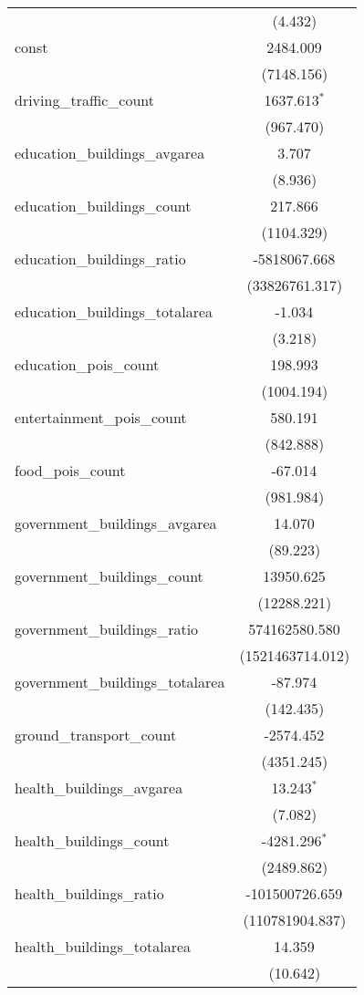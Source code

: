 \begin{table}[!htbp]
\begin{tabular}{@{\extracolsep{5pt}}lc}
  & (4.432) \\
 const & 2484.009$^{}$ \\
  & (7148.156) \\
 driving_traffic_count & 1637.613$^{*}$ \\
  & (967.470) \\
 education_buildings_avgarea & 3.707$^{}$ \\
  & (8.936) \\
 education_buildings_count & 217.866$^{}$ \\
  & (1104.329) \\
 education_buildings_ratio & -5818067.668$^{}$ \\
  & (33826761.317) \\
 education_buildings_totalarea & -1.034$^{}$ \\
  & (3.218) \\
 education_pois_count & 198.993$^{}$ \\
  & (1004.194) \\
 entertainment_pois_count & 580.191$^{}$ \\
  & (842.888) \\
 food_pois_count & -67.014$^{}$ \\
  & (981.984) \\
 government_buildings_avgarea & 14.070$^{}$ \\
  & (89.223) \\
 government_buildings_count & 13950.625$^{}$ \\
  & (12288.221) \\
 government_buildings_ratio & 574162580.580$^{}$ \\
  & (1521463714.012) \\
 government_buildings_totalarea & -87.974$^{}$ \\
  & (142.435) \\
 ground_transport_count & -2574.452$^{}$ \\
  & (4351.245) \\
 health_buildings_avgarea & 13.243$^{*}$ \\
  & (7.082) \\
 health_buildings_count & -4281.296$^{*}$ \\
  & (2489.862) \\
 health_buildings_ratio & -101500726.659$^{}$ \\
  & (110781904.837) \\
 health_buildings_totalarea & 14.359$^{}$ \\
  & (10.642) \\

\end{tabular}
\end{table}
